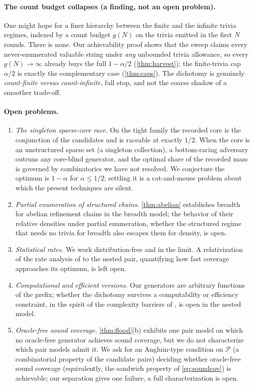 \documentclass[11pt]{article}
\numberwithin{equation}{section}
\newcommand{\mc}[1]{\mathcal{#1}}
\newcommand{\Pairs}{\mc{P}}
\theoremstyle{plain}
\theoremstyle{definition}
\theoremstyle{remark}
\begin{document}
\paragraph{The count budget collapses (a finding, not an open problem).}
One might hope for a finer hierarchy between the finite and the infinite trivia regimes,
indexed by a count budget $g(N)$ on the trivia emitted in the first $N$ rounds. There is none.
Our achievability proof shows that the sweep claims every never-enumerated valuable string
under \emph{any} unbounded trivia allowance, so every $g(N)\to\infty$ already buys the full
$1-\alpha/2$ (\cref{thm:harvest}); the finite-trivia cap $\alpha/2$ is exactly the
complementary case (\cref{thm:caps}). The dichotomy is genuinely \emph{count-finite versus
count-infinite}, full stop, and not the coarse shadow of a smoother trade-off.

\paragraph{Open problems.}
\begin{enumerate}
  \item \emph{The singleton sparse-core race.} On the tight family the recorded core is the
    conjunction of the candidates and is raceable at exactly $1/2$. When the core is an
    unstructured sparse set (a singleton collection), a bottom-racing adversary outruns any
    core-blind generator, and the optimal share of the recorded mass is governed by
    combinatorics we have not resolved. We conjecture the optimum is $1-\alpha$ for $\alpha\le
    1/2$; settling it is a cat-and-mouse problem about which the present techniques are
    silent.
  \item \emph{Partial enumeration of structured chains.} \cref{thm:abelian} establishes
    breadth for abelian refinement chains in the breadth model; the behavior of their relative
    densities under partial enumeration, whether the structured regime that needs no trivia
    for breadth also escapes them for density, is open.
  \item \emph{Statistical rates.} We work distribution-free and in the limit. A relativization
    of the rate analysis of \citet{kalavasis2025limits} to the nested pair, quantifying how
    fast coverage approaches its optimum, is left open.
  \item \emph{Computational and efficient versions.} Our generators are arbitrary functions of
    the prefix; whether the dichotomy survives a computability or efficiency constraint, in
    the spirit of the complexity barriers of \citet{arenas2025complexity}, is open in the
    nested model.
  \item \emph{Oracle-free sound coverage.} \cref{thm:flood}(b) exhibits one pair model on
    which no oracle-free generator achieves sound coverage, but we do not characterize which
    pair models admit it. We ask for an Angluin-type condition on $\Pairs$ (a combinatorial
    property of the candidate pairs) deciding whether oracle-free sound coverage
    (equivalently, the sandwich property of \eqref{eq:soundcov}) is achievable; our separation
    gives one failure, a full characterization is open.
\end{enumerate}
\end{document}
